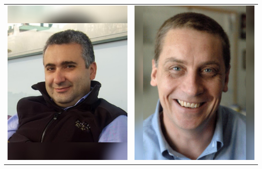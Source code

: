 \documentclass[landscape,a0paper,fontscale=0.292]{baposter}
\begin{document}
\begin{poster}
{\begin{center}
\begin{tabularx}{\linewidth}{X X}
{\centering \includegraphics[width=0.85\linewidth]{frazzoli.jpg}}&
{\centering \includegraphics[width=0.85\linewidth]{how.jpg}}\\ 


\end{tabularx}
\end{center}}
\end{poster}
\end{document}
